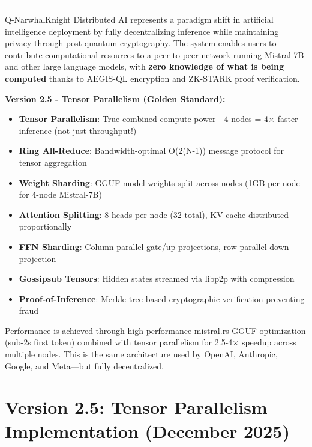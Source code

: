 \documentclass[11pt,a4paper]{article}
\begin{document}
\vspace{1cm}
\hrule
\vspace{0.5cm}

\begin{tcolorbox}[colback=privacygreen!10,colframe=privacygreen,title=\textbf{Executive Summary (v2.5 - December 2025)}]
Q-NarwhalKnight Distributed AI represents a paradigm shift in artificial intelligence deployment by fully decentralizing inference while maintaining privacy through post-quantum cryptography. The system enables users to contribute computational resources to a peer-to-peer network running Mistral-7B and other large language models, with \textbf{zero knowledge of what is being computed} thanks to AEGIS-QL encryption and ZK-STARK proof verification.

\textbf{Version 2.5 - Tensor Parallelism (Golden Standard):}
\begin{itemize}[noitemsep]
    \item \textbf{Tensor Parallelism}: True combined compute power---4 nodes = 4$\times$ faster inference (not just throughput!)
    \item \textbf{Ring All-Reduce}: Bandwidth-optimal O(2(N-1)) message protocol for tensor aggregation
    \item \textbf{Weight Sharding}: GGUF model weights split across nodes (1GB per node for 4-node Mistral-7B)
    \item \textbf{Attention Splitting}: 8 heads per node (32 total), KV-cache distributed proportionally
    \item \textbf{FFN Sharding}: Column-parallel gate/up projections, row-parallel down projection
    \item \textbf{Gossipsub Tensors}: Hidden states streamed via libp2p with compression
    \item \textbf{Proof-of-Inference}: Merkle-tree based cryptographic verification preventing fraud
\end{itemize}
Performance is achieved through high-performance mistral.rs GGUF optimization (sub-2s first token) combined with tensor parallelism for 2.5-4$\times$ speedup across multiple nodes. This is the same architecture used by OpenAI, Anthropic, Google, and Meta---but fully decentralized.
\end{tcolorbox}

\newpage
\tableofcontents
\newpage

\section{Version 2.5: Tensor Parallelism Implementation (December 2025)}
\end{document}
